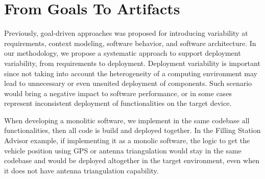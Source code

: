 \section{From Goals To Artifacts}

Previously, goal-driven  approaches was proposed for introducing variability at requirements, context modeling, software behavior, and software architecture\cite{angelopoulos_capturing_2015}\cite{yu_goals_2008}.
In our methodology, we propose a systematic approach to support deployment variability, from requirements to deployment.
Deployment variability is important since not taking into account the heterogeneity of a computing environment may lead to unnecessary or even unsuited deployment of components.
Such scenario would bring a negative impact to software performance, or in some cases represent inconsistent deployment of functionalities on the target device.


When developing a monolitic software, we implement in the same codebase all functionalities, then all code is build and deployed together.
In the Filling Station Advisor example, if implementing it as a monolic software, the logic to get the vehicle position using GPS or antenna triangulation would stay in the same codebase and would be deployed altogether in the target environment, even when it does not have antenna triangulation capability.



